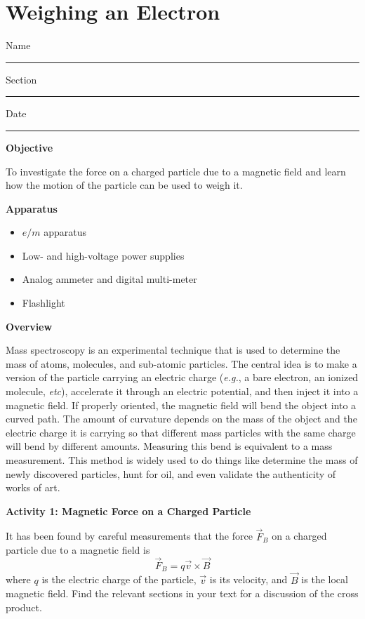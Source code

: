 \setcounter{equation}{0}
\setcounter{figure}{0}

\section{Weighing an Electron}

Name \rule{2.0in}{0.1pt}\hfill{}Section \rule{1.0in}{0.1pt}\hfill{}Date
\rule{1.0in}{0.1pt}

\textbf{Objective}

To investigate the force on a charged particle due to a magnetic field and 
learn how the motion of the particle can be used to weigh it.

\textbf{Apparatus}

\begin{itemize}

\item $e/m$ apparatus

\item Low- and high-voltage power supplies

\item Analog ammeter and digital multi-meter

\item Flashlight

\end{itemize}

\textbf{Overview}

Mass spectroscopy is an experimental technique that is used to determine
the mass of atoms, molecules, and sub-atomic particles.
The central idea is to make a version of the particle carrying an electric
charge ({\it e.g.}, a bare electron, an ionized molecule, {\it etc}), accelerate it
through an electric potential, and then inject it into a magnetic field.
If properly oriented, the magnetic field will bend the object into
a curved path.
The amount of curvature depends on the mass of the object and the electric
charge it is carrying so that different mass particles with the same charge will
bend by different amounts.
Measuring this bend is equivalent to a mass measurement.
This method is widely used to do things like determine the mass of newly discovered particles,
hunt for oil, and even validate the authenticity of works of art.

\textbf{Activity 1: Magnetic Force on a Charged Particle}

It has been found by careful measurements that the force $\vec F_B$ on a charged
particle due to a magnetic field is
\begin{equation}
\vec F_B = q \vec v \times \vec B
\end{equation}
where $q$ is the electric charge of the particle, $\vec v$ is its velocity,
and $\vec B$ is the local magnetic field.
Find the relevant sections in your text for a discussion of the cross product.

